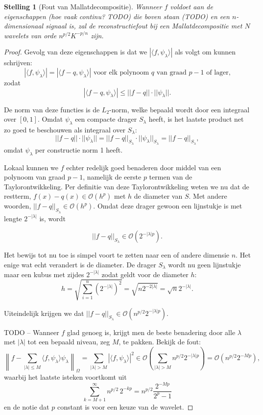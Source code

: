 \documentclass[11pt]{amsart}
\newtheorem*{stelling}{Stelling}
\begin{document}
\begin{stelling}[Fout van Mallatdecompositie]
Wanneer $f$ voldoet aan de eigenschappen (hoe vaak continu? TODO) die boven staan (TODO) en een $n$-dimensionaal signaal is, zal de reconstructiefout bij een Mallatdecompositie met $N$ wavelets van orde $n^{p/2} K^{-p/n}$ zijn.
\end{stelling}
\begin{proof}
Gevolg van deze eigenschappen is dat we $|\langle f, \psi_\lambda\rangle |$ als volgt om kunnen schrijven:
\[
	|\langle f, \psi_\lambda \rangle | = |\langle f-q, \psi_\lambda \rangle | \text{ voor elk polynoom $q$ van graad $p-1$ of lager,} 
\]
zodat
\[
	|\langle f-q, \psi_\lambda \rangle | \leq ||f-q|| \cdot ||\psi_\lambda||.
\]

De norm van deze functies is de $L_2$-norm, welke bepaald wordt door een integraal over $[0,1]$. Omdat $\psi_\lambda$ een compacte drager $S_\lambda$ heeft, is het laatste product net zo goed te beschouwen als integraal over $S_\lambda$:
\[
	||f-q|| \cdot ||\psi_\lambda|| = ||f-q||_{S_\lambda} \cdot ||\psi_\lambda||_{S_\lambda} = ||f-q||_{S_\lambda},
\]
omdat $\psi_\lambda$ per constructie norm 1 heeft.

Lokaal kunnen we $f$ echter redelijk goed benaderen door middel van een polynoom van graad $p-1$, namelijk de eerste $p$ termen van de Taylorontwikkeling. Per definitie van deze Taylorontwikkeling weten we nu dat de restterm, $f(x)-q(x) \in \mathcal{O}(h^p)$ met $h$ de diameter van $S$.\cite[\S 31.\{3,4\}]{TODOross} Met andere woorden, $||f-q||_{S_\lambda} \in \mathcal{O}(h^p)$. Omdat deze drager gewoon een lijnstukje is met lengte $2^{-|\lambda|}$ is, wordt 

\[
	||f-q||_{S_\lambda} \in \mathcal{O}(2^{-|\lambda| p}).
\]

Het bewijs tot nu toe is simpel voort te zetten naar een of andere dimensie $n$. Het enige wat echt verandert is de diameter. De drager $S_\lambda$ wordt nu geen lijnstukje maar een kubus met zijdes $2^{-|\lambda|}$ zodat geldt voor de diameter $h$:
\[
	h = \sqrt{\sum_{i=1}^n (2^{-|\lambda|})^2} = \sqrt{n 2^{-2|\lambda|}} = \sqrt{n} 2^{-|\lambda|}.
\]

Uiteindelijk krijgen we dat $||f-q||_{S_\lambda} \in \mathcal{O}(n^{p/2} 2^{-|\lambda|p})$.

TODO -- Wanneer $f$ glad genoeg is, krijgt men de beste benadering door alle $\lambda$ met $|\lambda|$ tot een bepaald niveau, zeg $M$, te pakken. Bekijk de fout:
\[
	\left\| f - \sum_{|\lambda| \leq M} \langle f, \psi_\lambda \rangle \psi_\lambda \right\|_\Omega = \sum_{|\lambda| > M} | \langle f, \psi_\lambda \rangle |^2 \in \mathcal{O}\left(\sum_{|\lambda| > M} n^{p/2} 2^{-|\lambda|p} \right) = \mathcal{O}(n^{p/2}2^{-Mp}),
\]
waarbij het laatste isteken voortkomt uit
\[
	\sum_{k=M+1}^\infty n^{p/2} \, 2^{- kp} = n^{p/2} \frac{2^{-Mp}}{2^p-1}
\]
en de notie dat $p$ constant is voor een keuze van de wavelet.


\end{proof}
\end{document}
